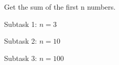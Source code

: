 Get the sum of the first n numbers.

Subtask 1: $n = 3$

Subtask 2: $n = 10$

Subtask 3: $n = 100$

